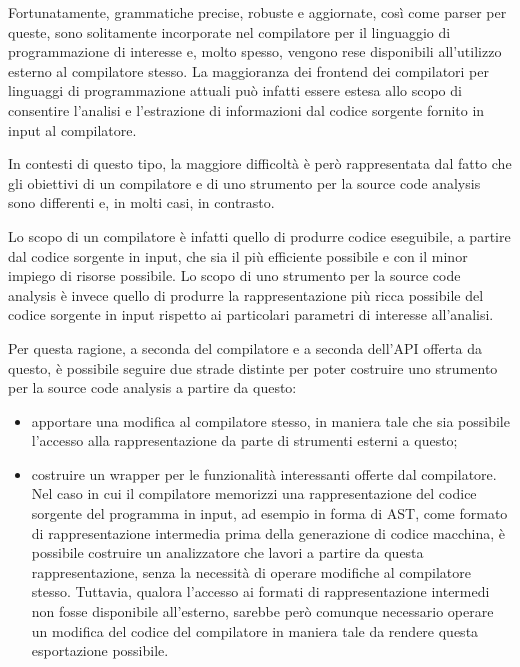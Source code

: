 Fortunatamente, grammatiche precise, robuste e aggiornate, così come parser per
queste, sono solitamente incorporate nel compilatore per il linguaggio di
programmazione di interesse e, molto spesso, vengono rese disponibili
all’utilizzo esterno al compilatore stesso. La maggioranza dei frontend dei
compilatori per linguaggi di programmazione attuali può infatti essere estesa
allo scopo di consentire l’analisi e l’estrazione di informazioni dal codice
sorgente fornito in input al compilatore. \cite{gregor2012}

In contesti di questo tipo, la maggiore difficoltà è però rappresentata dal
fatto che gli obiettivi di un compilatore e di uno strumento per la source code
analysis sono differenti e, in molti casi, in contrasto.

Lo scopo di un compilatore è infatti quello di produrre codice eseguibile, a
partire dal codice sorgente in input, che sia il più efficiente possibile e con
il minor impiego di risorse possibile. Lo scopo di uno strumento per la source
code analysis è invece quello di produrre la rappresentazione più ricca
possibile del codice sorgente in input rispetto ai particolari parametri di
interesse all’analisi.

Per questa ragione, a seconda del compilatore e a seconda dell’API offerta da
questo, è possibile seguire due strade distinte per poter costruire uno
strumento per la source code analysis a partire da questo:

\begin{itemize}

\item apportare una modifica al compilatore stesso, in maniera tale che sia
possibile l'accesso alla rappresentazione da parte di strumenti esterni a
questo;

\item costruire un wrapper per le funzionalità interessanti offerte dal
compilatore. Nel caso in cui il compilatore memorizzi una rappresentazione del
codice sorgente del programma in input, ad esempio in forma di AST, come formato
di rappresentazione intermedia prima della generazione di codice macchina, è
possibile costruire un analizzatore che lavori a partire da questa
rappresentazione, senza la necessità di operare modifiche al compilatore stesso.
Tuttavia, qualora l’accesso ai formati di rappresentazione intermedi non fosse
disponibile all’esterno, sarebbe però comunque necessario operare un modifica
del codice del compilatore in maniera tale da rendere questa esportazione
possibile.

\end{itemize}

